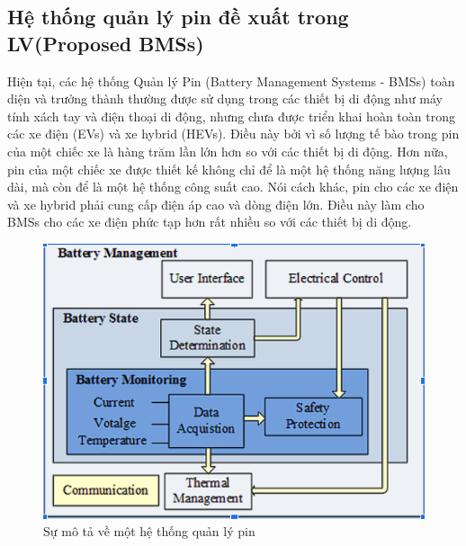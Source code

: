 \documentclass[a4paper,13pt]{article}
\theoremstyle{mytheor}
\begin{document}
\subsection{Hệ thống quản lý pin đề xuất trong LV(Proposed BMSs)}
Hiện tại, các hệ thống Quản lý Pin (Battery Management Systems - BMSs) toàn diện và trưởng thành thường được sử dụng trong các thiết bị di động như máy tính xách tay và điện thoại di động, nhưng chưa được triển khai hoàn toàn trong các xe điện (EVs) và xe hybrid (HEVs). Điều này bởi vì số lượng tế bào trong pin của một chiếc xe là hàng trăm lần lớn hơn so với các thiết bị di động. Hơn nữa, pin của một chiếc xe được thiết kế không chỉ để là một hệ thống năng lượng lâu dài, mà còn để là một hệ thống công suất cao. Nói cách khác, pin cho các xe điện và xe hybrid phải cung cấp điện áp cao và dòng điện lớn. Điều này làm cho BMSs cho các xe điện phức tạp hơn rất nhiều so với các thiết bị di động.\\ 
\vspace{7cm}
\begin{figure}
    \centering
    \includegraphics{bms.png}
    \caption{Sự mô tả về một hệ thống quản lý pin }
    \label{fig:enter-label}
\end{figure}

\vspace{7cm}
\end{document}

